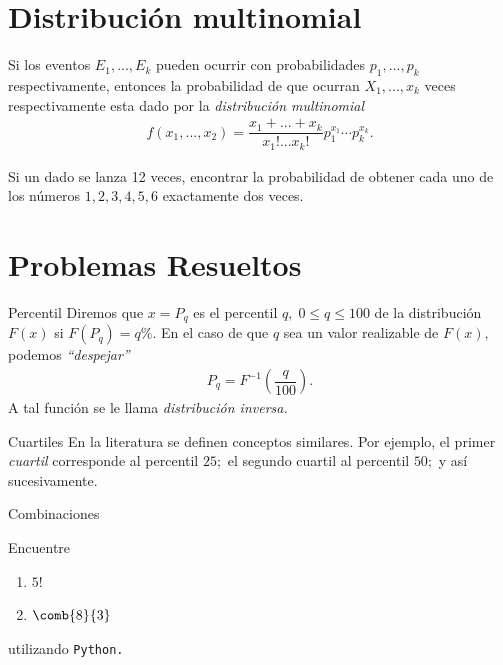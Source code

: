 \section{Distribución multinomial}

 Si los eventos $E_{1},...,E_{k}$ pueden ocurrir con probabilidades $p_{1},...,p_{k}$ respectivamente, entonces la probabilidad de que ocurran $X_{1},...,x_{k}$ veces respectivamente esta dado por la \emph{distribución multinomial}
 \begin{align}
  \label{eq:0.7.6}
  f\left( x_{1},...,x_{2} \right)=
  \dfrac{x_{1}+...+x_{k}}{x_{1}!...x_{k}!}p_{1}^{x_{1}}\cdots p_{k}^{x_{k}}.
 \end{align}



 \begin{ejemplo}
  \label{exmp:0.7.7}
Si un dado se lanza 12 veces, encontrar la probabilidad de obtener cada uno de los números $1,2,3,4,5,6$ exactamente dos veces.
 \end{ejemplo}



\section{Problemas Resueltos}
{Percentil}
 Diremos que $x=P_{q}$ es el percentil $q, \; 0\leq q \leq 100$ de la distribución $F(x)$ si $F(P_{q})=q\%.$  En el caso de que $q$ sea un valor realizable de $F(x),$ podemos \emph{``despejar''}
 \begin{align}
  P_{q}=F^{-1}\left( \dfrac{q}{100} \right).
 \end{align}
 A tal función se le llama \emph{distribución inversa.}


{Cuartiles}
 En la literatura se definen conceptos similares. Por ejemplo, el primer \emph{cuartil} corresponde al percentil $25;$ el segundo cuartil al percentil $50;$ y así sucesivamente.

{Combinaciones}
 \begin{ejemplo}
  \label{sol:0.7.1}
  Encuentre
  \begin{enumerate}
   \item $5!$
   \item $\comb{8}{3}$
  \end{enumerate}
  utilizando \texttt{Python.}
 \end{ejemplo}








